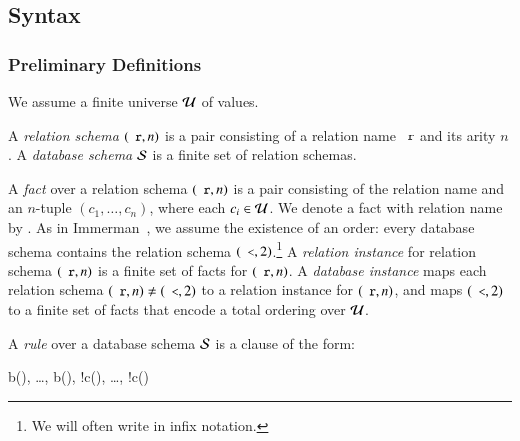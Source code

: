 
\subsection{Syntax}

\subsubsection{Preliminary Definitions}


We assume a finite universe $\univ$ of values.

A {\em relation schema} $(\dedalus{r},n)$ is a pair consisting of a relation name $\dedalus{r}$ and its arity $n$.
A {\em database schema} $\schema$ is a finite set of relation schemas.

A {\em fact} over a relation schema $(\dedalus{r}, n)$ is a pair consisting of
the relation name  and an $n$-tuple $(c_1,\ldots,c_n)$, where each
$c_i \in \univ$.  We denote a fact with relation name  by
.  As in Immerman~\cite{immerman-ptime}, we assume
the existence of an order: every database schema contains the relation schema
$(\dedalus{<},2)$.\footnote{We will often write \dedalus{<} in infix notation.} 
A {\em relation instance} for relation schema $(\dedalus{r},n)$ is a finite set of facts for
$(\dedalus{r},n)$.  A {\em database instance} maps each relation schema $(\dedalus{r},n) \ne
(\dedalus{<},2)$ to a relation instance for $(\dedalus{r},n)$, and maps $(\dedalus{<},2)$ to a
finite set of \dedalus{<} facts that encode a total ordering over $\univ$.

A {\em rule} over a database schema $\schema$ is a clause of the form:

\begin{Drules}
        {b(), \ldots, b(), !c(), \ldots, !c()}
\end{Drules}

